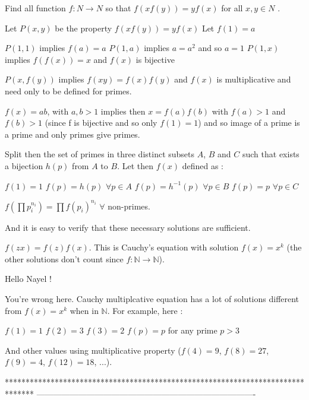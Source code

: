 \begin{solution}
	\begin{tcolorbox}Find all function $ f: N\to N$ so that $ f(xf(y)) = yf(x)$ for all $ x,y \in N$ .\end{tcolorbox}

Let $ P(x,y)$ be the property $ f(xf(y)) = yf(x)$
Let $ f(1)=a$

$ P(1,1)$ implies $ f(a)=a$
$ P(1,a)$ implies $ a=a^2$ and so $ a=1$
$ P(1,x)$ implies $ f(f(x))=x$ and $ f(x)$ is bijective

$ P(x,f(y))$ implies $ f(xy)=f(x)f(y)$ and $ f(x)$ is multiplicative and need only to be defined for primes.

$ f(x)=ab$, with $ a,b>1$ implies then $ x=f(a)f(b)$ with $ f(a)>1$ and $ f(b)>1$ (since f is bijective and so only $ f(1)=1$) and so image of a prime is a prime and only primes give primes.

Split then the set of primes in three distinct subsets $ A$, $ B$ and $ C$ such that exists a bijection $ h(p)$ from $ A$ to $ B$.
Let then $ f(x)$ defined as :

$ f(1)=1$
$ f(p)=h(p)$ $ \forall p\in A$
$ f(p)=h^{-1}(p)$ $ \forall p\in B$
$ f(p)=p$ $ \forall p\in C$

$ f(\prod p_i^{n_i})=\prod f(p_i)^{n_i}$ $ \forall$ non-primes.

And it is easy to verify that these necessary solutions are sufficient.
\end{solution}



\begin{solution}
	\begin{tcolorbox}$ f(zx) = f(z)f(x)$. This is Cauchy's equation with solution  $ f(x) = x^k$ (the other solutions don't count since $ f: \mathbb N\to\mathbb N$). \end{tcolorbox}

Hello Nayel !

You're wrong here. Cauchy multiplcative equation has a lot of solutions different from  $ f(x) = x^k$ when in $ \mathbb{N}$. For example, here :

$ f(1)=1$
$ f(2)=3$
$ f(3)=2$
$ f(p)=p$ for any prime $ p>3$

And other values using multiplicative property ($ f(4)=9$, $ f(8)=27$, $ f(9)=4$, $ f(12)=18$, ...).
\end{solution}
*******************************************************************************
-------------------------------------------------------------------------------

